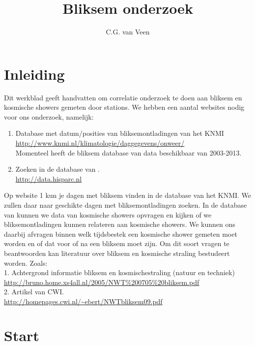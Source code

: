 

\title{Bliksem onderzoek}
\author{C.G. van Veen}



\maketitle

\section{Inleiding}

Dit werkblad geeft handvatten om correlatie onderzoek te doen aan bliksem en 
kosmische showers gemeten door \hisparc stations. 
We hebben een aantal websites nodig voor ons onderzoek, namelijk:
\begin{enumerate}
    \item Database met datum/posities van bliksemontladingen van het KNMI\\
    \url{ http://www.knmi.nl/klimatologie/daggegevens/onweer/} \\
    Momenteel heeft de bliksem database van \hisparc data beschikbaar van 2003-2013.
    \item Zoeken in de database van \hisparc.\\
    \url{http://data.hisparc.nl}
\end{enumerate}

Op website 1 kun je dagen met bliksem vinden in de database van het KNMI. 
We zullen daar naar geschikte dagen met bliksemontladingen zoeken.
In de database van \hisparc kunnen we data van kosmische showers opvragen en
kijken of we bliksemontladingen kunnen relateren aan kosmische showers.
We kunnen ons daarbij afvragen binnen welk tijdsbestek een kosmische shower gemeten
moet worden en of dat voor of na een bliksem moet zijn. Om dit soort vragen te 
beantwoorden kan literatuur over bliksem en kosmische straling bestudeert worden.
Zoals:\\
1. Achtergrond informatie bliksem en kosmischestraling (natuur en techniek)\\
\url{http://bruno.home.xs4all.nl/2005/NWT%200705%20bliksem.pdf}\\
2. Artikel van CWI.\\
\url{http://homepages.cwi.nl/~ebert/NWTbliksem09.pdf}\\

\section{Start}

